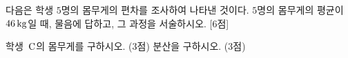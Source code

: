다음은 학생 $5$명의 몸무게의 편차를 조사하여 나타낸 것이다. $5$명의 몸무게의 평균이 $46\mkern3mu \mathrm{kg}$일 때, 물음에 답하고, 그 과정을 서술하시오. \mbox{[6점]}\par\nobreak{}
 학생~$\mathrm{C}$의 몸무게를 구하시오. (3점)
 분산을 구하시오. (3점)
